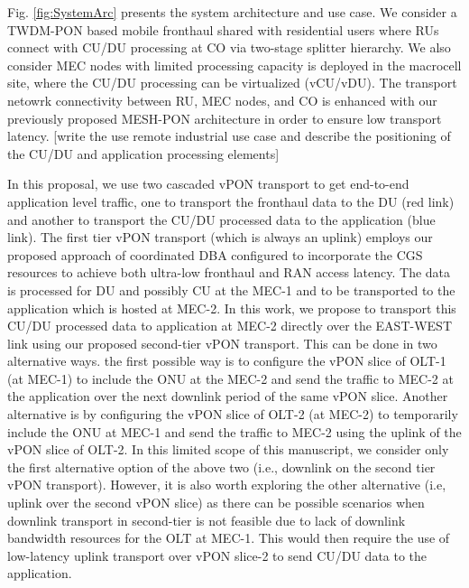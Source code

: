 \documentclass[a4paper, oneside, twocolumn, notitlepage, 10pt]{extarticle_ecoc}
\begin{document}
	Fig. \ref{fig:SystemArc} presents the system architecture and use case. We consider a \ac{TWDM}-\ac{PON} based mobile fronthaul shared with residential users where RUs connect with CU/DU processing at \ac{CO} via two-stage splitter hierarchy. We also consider MEC nodes with limited processing capacity is deployed in the macrocell site, where the CU/DU processing can be virtualized (vCU/vDU). The transport netowrk connectivity between \ac{RU}, \ac{MEC} nodes, and \ac{CO} is enhanced with our previously proposed MESH-PON architecture \cite{MESH-PON} in order to ensure low transport latency. [write the use remote industrial use case and describe the positioning of the CU/DU and application processing elements]
	
	In this proposal, we use two cascaded vPON transport to get end-to-end application level traffic, one to transport the fronthaul data to the DU (red link) and another to transport the CU/DU processed data to the application (blue link). The first tier vPON transport (which is always an uplink) employs our proposed approach of coordinated DBA configured to incorporate the CGS resources to achieve both ultra-low fronthaul and RAN access latency. The data is processed for DU and possibly CU at the MEC-1 and to be transported to the application which is hosted at MEC-2. In this work, we propose to transport this CU/DU processed data to application at MEC-2 directly over the EAST-WEST link using our proposed second-tier vPON transport. This can be done in two alternative ways. the first possible way is to configure the vPON slice of OLT-1 (at MEC-1) to include the ONU at the MEC-2 and send the traffic to MEC-2 at the application over the next downlink period of the same vPON slice. Another alternative is by configuring the vPON slice of OLT-2 (at MEC-2) to temporarily include the ONU at MEC-1 and send the traffic to MEC-2 using the uplink of the vPON slice of OLT-2. In this limited scope of this manuscript, we consider only the first alternative option of the above two (i.e., downlink on the second tier vPON transport). However, it is also worth exploring the other alternative (i.e, uplink over the second vPON slice) as there can be possible scenarios when downlink transport in second-tier is not feasible due to lack of downlink bandwidth resources for  the OLT at MEC-1. This would then require the use of low-latency uplink transport over vPON slice-2 to send CU/DU data to the application. 
	
\end{document}
